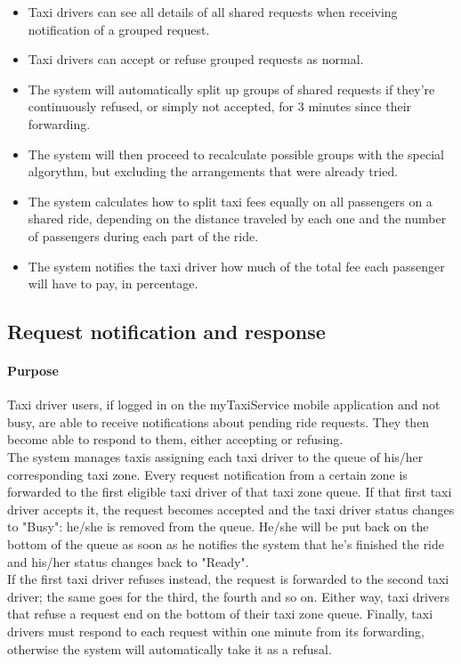 \begin{itemize}
			\item Taxi drivers can see all details of all shared requests when receiving notification of a grouped request.
			\item Taxi drivers can accept or refuse grouped requests as normal.
			\item The system will automatically split up groups of shared requests if they're continuously refused, or simply not accepted, for 3 minutes since their forwarding.
			\item The system will then proceed to recalculate possible groups with the special algorythm, but excluding the arrangements that were already tried.
			\item The system calculates how to split taxi fees equally on all passengers on a shared ride, depending on the distance traveled by each one and the number of passengers during each part of the ride.
			\item The system notifies the taxi driver how much of the total fee each passenger will have to pay, in percentage.
		\end{itemize}
	
\subsection{Request notification and response}
	\paragraph{Purpose}
		Taxi driver users, if logged in on the myTaxiService mobile application and not busy, are able to receive notifications about pending ride requests. They then become able to respond to them, either accepting or refusing.\\
		The system manages taxis assigning each taxi driver to the queue of his/her corresponding taxi zone. Every request notification from a certain zone is forwarded to the first eligible taxi driver of that taxi zone queue. If that first taxi driver accepts it, the request becomes accepted and the taxi driver status changes to "Busy": he/she is removed from the queue. He/she will be put back on the bottom of the queue as soon as he notifies the system that he's finished the ride and his/her status changes back to "Ready".\\
		If the first taxi driver refuses instead, the request is forwarded to the second taxi driver; the same goes for the third, the fourth and so on. Either way, taxi drivers that refuse a request end on the bottom of their taxi zone queue. Finally, taxi drivers must respond to each request within one minute from its forwarding, otherwise the system will automatically take it as a refusal.
	
